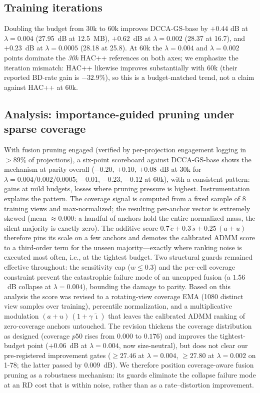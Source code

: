\documentclass[conference]{IEEEtran}
\newcommand{\DCCA}{DCCA-GS}
\begin{document}
\subsection{Training iterations}
Doubling the budget from 30k to 60k improves \DCCA{}-base by $+0.44$ dB at
$\lambda{=}0.004$ (27.95~dB at 12.5~MB), $+0.62$~dB at $\lambda{=}0.002$
(28.37 at 16.7), and $+0.23$~dB at $\lambda{=}0.0005$ (28.18 at 25.8).
At 60k the $\lambda{=}0.004$ and $\lambda{=}0.002$ points dominate the
\emph{30k} HAC++ references on both axes; we emphasize the iteration mismatch:
HAC++ likewise improves substantially with 60k
(their reported BD-rate gain is $-32.9\%$), so this is a budget-matched
trend, not a claim against HAC++ at 60k.

\subsection{Analysis: importance-guided pruning under sparse coverage}
\label{sec:analysis}
With fusion pruning engaged (verified by per-projection engagement logging in
$>89\%$ of projections), a six-point scoreboard against \DCCA{}-base shows
the mechanism at parity overall ($-0.20$, $+0.10$, $+0.08$~dB at 30k for
$\lambda{=}0.004/0.002/0.0005$; $-0.01$, $-0.23$, $-0.12$ at 60k), with a
consistent pattern: gains at mild budgets, losses where pruning pressure is
highest. Instrumentation explains the pattern. The coverage signal is
computed from a fixed sample of 8 training views and max-normalized; the
resulting per-anchor vector is extremely skewed (mean $\approx 0.000$: a
handful of anchors hold the entire normalized mass, the silent majority is
exactly zero). The additive score $0.7\,\tilde{c} + 0.3\,\tilde{s} +
0.25\,(a+u)$ therefore pins its scale on a few anchors and demotes the
calibrated ADMM score to a third-order term for the unseen majority---exactly
where ranking noise is executed most often, i.e., at the tightest budget.
Two structural guards remained effective throughout: the sensitivity cap
($w \le 0.3$) and the per-cell coverage constraint prevent the catastrophic
failure mode of an uncapped fusion (a $1.56$~dB collapse at
$\lambda{=}0.004$), bounding the damage to parity. Based on this analysis
the score was revised to a rotating-view coverage EMA (1080 distinct view
samples over training), percentile normalization, and a multiplicative
modulation $(a+u)\,(1+\gamma\,\tilde{\imath})$ that leaves the calibrated
ADMM ranking of zero-coverage anchors untouched. The revision thickens the
coverage distribution as designed (coverage $p50$ rises from $0.000$ to
$0.176$) and improves the tightest-budget point ($+0.06$~dB at
$\lambda{=}0.004$, now size-neutral), but does not clear our pre-registered
improvement gates ($\ge 27.46$ at $\lambda{=}0.004$,
$\ge 27.80$ at $\lambda{=}0.002$ on 1-78; the latter passed by $0.009$~dB).
We therefore position coverage-aware fusion pruning as a robustness
mechanism: its guards eliminate the collapse failure mode at an RD cost
that is within noise, rather than as a rate--distortion improvement.
\end{document}
